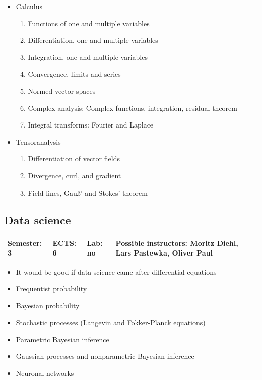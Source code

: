 \documentclass[12pt,twoside,fleqn,a4paper]{article}
\newcommand{\lp}[1]{{\color{red} #1}}  %
\begin{document}
\begin{itemize}
\setlength\itemsep{0cm}
\item Calculus
\begin{enumerate}
    \item Functions of one and multiple variables
    \item Differentiation, one and multiple variables
    \item Integration, one and multiple variables
    \item Convergence, limits and series
    \item Normed vector spaces
    \item Complex analysis: Complex functions, integration, residual theorem
    \item Integral transforms: Fourier and Laplace
\end{enumerate}
\item Tensoranalysis
\begin{enumerate}
    \item Differentiation of vector fields
    \item Divergence, curl, and gradient
    \item Field lines, Gauß' and Stokes' theorem
\end{enumerate}
\end{itemize}


\subsection{Data science}
\begin{tabular}{llll} \hline
\textbf{Semester:} 3 & \textbf{ECTS:} 6 & \textbf{Lab:} no & \textbf{Possible instructors:} Moritz Diehl, Lars Pastewka, Oliver Paul \\
\hline
\end{tabular}

\begin{itemize}
\setlength\itemsep{0cm}
\item \lp{It would be good if data science came after differential equations}
\item Frequentist probability
\item Bayesian probability
\item Stochastic processes (Langevin and Fokker-Planck equations)
\item Parametric Bayesian inference
\item Gaussian processes and nonparametric Bayesian inference
\item Neuronal networks
\end{itemize}
\end{document}
